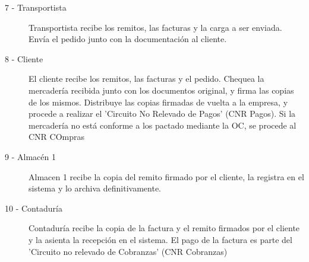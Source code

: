 \begin{description}
	\item[7 - Transportista] Transportista recibe los remitos, las facturas y la carga a ser enviada. Env\'ia el pedido junto con la documentaci\'on al cliente. 
	\item[8 - Cliente] El cliente recibe los remitos, las facturas y el pedido. Chequea la mercader\'ia recibida junto con los documentos original, y firma las copias de los mismos. Distribuye las copias firmadas de vuelta a la empresa, y procede a realizar el 'Circuito No Relevado de Pagos' (CNR Pagos). Si la mercader\'ia no est\'a conforme a los pactado mediante la OC, se procede al CNR COmpras
	\item[9 - Almac\'en 1] Almacen 1 recibe la copia del remito firmado por el cliente, la registra en el sistema y lo archiva definitivamente. 
	\item[10 - Contadur\'ia] Contadur\'ia recibe la copia de la factura y el remito firmados por el cliente y la asienta la recepci\'on en el sistema. El pago de la factura es parte del 'Circuito no relevado de Cobranzas' (CNR Cobranzas)
\end{description}

